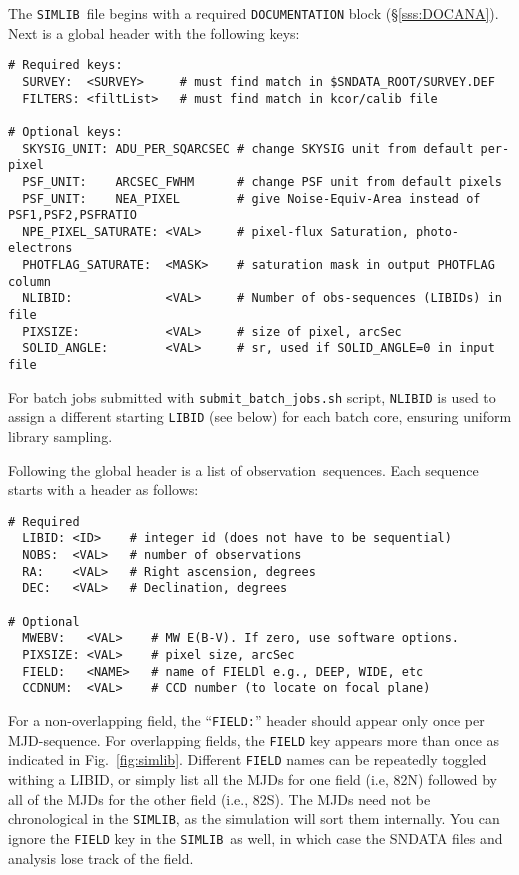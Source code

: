 \documentclass[12pt]{article}
\newcommand{\simlib}{{\tt SIMLIB}}
\newcommand{\obs}{observation}
\newcommand{\submit}{\tt submit\_batch\_jobs.sh}
\begin{document}
{The \simlib\ file begins with a required {\tt DOCUMENTATION} block
(\S\ref{sss:DOCANA}).
Next is a global header with the following keys:
\begin{verbatim}
# Required keys:
  SURVEY:  <SURVEY>     # must find match in $SNDATA_ROOT/SURVEY.DEF
  FILTERS: <filtList>   # must find match in kcor/calib file 

# Optional keys:
  SKYSIG_UNIT: ADU_PER_SQARCSEC # change SKYSIG unit from default per-pixel
  PSF_UNIT:    ARCSEC_FWHM      # change PSF unit from default pixels
  PSF_UNIT:    NEA_PIXEL        # give Noise-Equiv-Area instead of PSF1,PSF2,PSFRATIO
  NPE_PIXEL_SATURATE: <VAL>     # pixel-flux Saturation, photo-electrons
  PHOTFLAG_SATURATE:  <MASK>    # saturation mask in output PHOTFLAG column
  NLIBID:             <VAL>     # Number of obs-sequences (LIBIDs) in file
  PIXSIZE:            <VAL>     # size of pixel, arcSec
  SOLID_ANGLE:        <VAL>     # sr, used if SOLID_ANGLE=0 in input file
\end{verbatim} 
%
For batch jobs submitted with {\submit} script,
{\tt NLIBID} is used to assign a different starting {\tt LIBID}
(see below) for each batch core, ensuring uniform library sampling.

\clearpage
Following the global header is a list of \obs\ sequences.
Each sequence starts with a header as follows:
\begin{verbatim}
# Required
  LIBID: <ID>    # integer id (does not have to be sequential)
  NOBS:  <VAL>   # number of observations
  RA:    <VAL>   # Right ascension, degrees
  DEC:   <VAL>   # Declination, degrees

# Optional
  MWEBV:   <VAL>    # MW E(B-V). If zero, use software options.
  PIXSIZE: <VAL>    # pixel size, arcSec
  FIELD:   <NAME>   # name of FIELDl e.g., DEEP, WIDE, etc
  CCDNUM:  <VAL>    # CCD number (to locate on focal plane)
\end{verbatim}
%
For a non-overlapping field, the ``{\tt FIELD:}'' header should appear
only once per MJD-sequence. For overlapping fields, 
the {\tt FIELD} key appears more than once as indicated
in Fig.~\ref{fig:simlib}.  
Different {\tt FIELD} names can be repeatedly toggled withing a LIBID,
or simply list all the MJDs for one field (i.e, 82N) followed by all 
of the MJDs for the other field (i.e., 82S).
The MJDs need not be chronological in the \simlib, as the simulation
will sort them internally. You can ignore the {\tt FIELD} key in the
\simlib\ as well, in which case the SNDATA files and analysis lose
track of the field.


}
\end{document}
